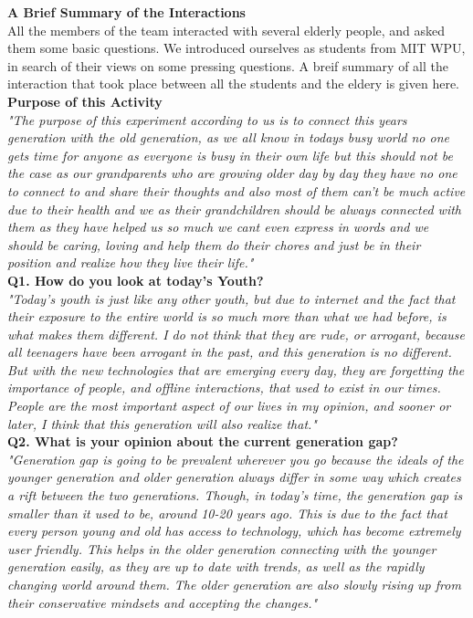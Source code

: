 \documentclass[11pt]{article}
\begin{document}
\clearpage

\noindent
\Large{\textbf{A Brief Summary of the Interactions}}\\

All the members of the team interacted with several elderly people, and asked them some basic questions. We introduced ourselves as students
from MIT WPU, in search of their views on some pressing questions. A breif summary of all the interaction that took place between all the 
students and the eldery is given here. \\

\noindent
\textbf{Purpose of this Activity}\\

\textit{"The purpose of this experiment according to us is to connect this years generation with the old generation, as we all know in todays
 busy world no one gets time for anyone as everyone is busy in their own life but this should not be
the case as our grandparents who are growing older day by day they have no one to connect to 
and share their thoughts and also most of them can't be much active due to their health and we as their grandchildren should be always connected with them as they have helped us so much we cant even express in words and we should be 
caring, loving and help them do their chores and just be in their position and realize how they live their life."}\\


\noindent
\textbf{Q1. How do you look at today's Youth?}\\

\textit{"Today's youth is just like any other youth, but due to internet and the fact that their exposure to the entire world
is so much more than what we had before, is what makes them different. I do not think that they are rude, or arrogant, because all 
teenagers have been arrogant in the past, and this generation is no different. But with the new technologies that are emerging every day, 
they are forgetting the importance of people, and offline interactions, that used to exist in our times. People are the most important aspect
of our lives in my opinion, and sooner or later, I think that this generation will also realize that."}\\

\textbf{Q2. What is your opinion about the current generation gap?}\\

\textit{"Generation gap is going to be prevalent wherever you go because the ideals of the younger generation and older generation always differ in some way which creates a rift between the two generations.
Though, in today's time, the generation gap is smaller than it used to be, around 10-20 years ago.
This is due to the fact that every person young and old has access to technology, which has become extremely user friendly.
This helps in the older generation connecting with the younger generation easily, as they are up to date with trends, as well as the rapidly changing world around them.
The older generation are also slowly rising up from their conservative mindsets and accepting the changes."}\\
\end{document}
